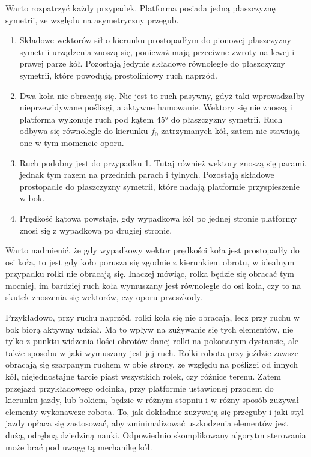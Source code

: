 		Warto rozpatrzyć każdy przypadek. Platforma posiada jedną płaszczyznę symetrii, ze względu na asymetryczny przegub.
		\begin{enumerate}
			\item Składowe wektorów sił o kierunku prostopadłym do pionowej płaszczyzny symetrii urządzenia znoszą się, ponieważ mają przeciwne zwroty na lewej i prawej parze kół.
			Pozostają jedynie składowe równoległe do płaszczyzny symetrii, które powodują prostoliniowy ruch naprzód.
			\item Dwa koła nie obracają się. Nie jest to ruch pasywny, gdyż taki wprowadzałby nieprzewidywane poślizgi, a aktywne hamowanie.
			Wektory się nie znoszą i platforma wykonuje ruch pod kątem 45° do płaszczyzny symetrii. Ruch odbywa się równolegle do kierunku $f_0$ zatrzymanych kół,
			zatem nie stawiają one w tym momencie oporu.
			\item Ruch podobny jest do przypadku 1. Tutaj również wektory znoszą się parami, jednak tym razem na przednich parach i tylnych. 
			Pozostają składowe prostopadłe do płaszczyzny symetrii, które nadają platformie przyspieszenie w bok.
			\item Prędkość kątowa powstaje, gdy wypadkowa kół po jednej stronie platformy znosi się z wypadkową po drugiej stronie.
		\end{enumerate}

		Warto nadmienić, że gdy wypadkowy wektor prędkości koła jest prostopadły do osi koła, to jest gdy
		koło porusza się zgodnie z kierunkiem obrotu, w idealnym przypadku rolki nie obracają się.
		Inaczej mówiąc, rolka będzie się obracać tym mocniej, im bardziej ruch koła wymuszany jest równolegle do osi koła, 
		czy to na skutek znoszenia się wektorów, czy oporu przeszkody.
		
		Przykładowo, przy ruchu naprzód, rolki koła się nie obracają, lecz przy ruchu w bok biorą aktywny udział.
		Ma to wpływ na zużywanie się tych elementów, nie tylko z punktu widzenia ilości obrotów danej rolki na pokonanym dystansie, 
		ale także sposobu w jaki wymuszany jest jej ruch.
		Rolki robota przy jeździe zawsze obracają się szarpanym ruchem w obie strony, ze względu na poślizgi od innych kół, 
		niejednostajne tarcie piast wszystkich rolek, czy różnice terenu. 
		Zatem przejazd przykładowego odcinka, przy platformie ustawionej przodem do kierunku jazdy, lub bokiem, będzie w różnym stopniu i w różny sposób zużywał elementy wykonawcze robota.
		To, jak dokładnie zużywają się przeguby i jaki styl jazdy opłaca się zastosować, aby zminimalizować uszkodzenia elementów jest dużą, odrębną dziedziną nauki.
		Odpowiednio skomplikowany algorytm sterowania może brać pod uwagę tą mechanikę kół.

